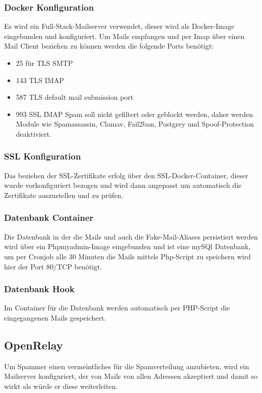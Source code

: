 \documentclass[a4paper,11pt,singlespacing]{article}
\begin{document}
		\subsubsection{Docker Konfiguration}\label{Mail-In-Container}
			Es wird ein Full-Stack-Mailserver verwendet, dieser wird als Docker-Image eingebunden und konfiguriert. Um Mails empfangen und per Imap über einen Mail Client beziehen zu können werden die folgende Ports benötigt:
		\begin{itemize}
			\item
				25 für TLS SMTP
			\item
				143 TLS IMAP
			\item
				587 TLS default mail submission port
			\item
				993 SSL IMAP
			Spam soll nicht gefiltert oder geblockt werden, daher werden Module wie Spamassassin, Clamav, Fail2ban, Postgrey und Spoof-Protection deaktiviert.
		\end{itemize}
			
		\subsubsection{SSL Konfiguration}\label{SSl-Container}
			Das beziehen der SSL-Zertifikate erfolg über den SSL-Docker-Container, dieser wurde vorkonfiguriert bezogen und wird dann angepasst um automatisch die Zertifikate auszustellen und zu prüfen.

		\subsubsection{Datenbank Container}\label{DB-Container}
			Die Datenbank in der die Mails und auch die Fake-Mail-Aliases persistiert werden wird über ein Phpmyadmin-Image eingebunden und ist eine mySQl Datenbank, um  per Cronjob alle 30 Minuten die Mails mittels Php-Script zu speichern wird hier der Port 80/TCP benötigt. 

		\subsubsection{Datenbank Hook}\label{DB-Hook-Container}
			Im Container für die Datenbank werden automatisch per PHP-Script die eingegangenen Mails gespeichert.

	\subsection{OpenRelay}\label{sec:UmsetzungOpenRelay} %
		Um Spammer einen vermeintliches  für die Spamverteilung anzubieten, wird ein Mailserver konfiguriert, der von Mails von allen Adressen akzeptiert und damit so wirkt als würde er diese weiterleiten.
		
\end{document}
